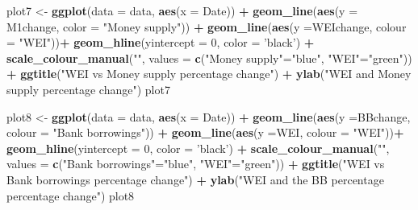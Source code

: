\documentclass[]{article}
\newenvironment{Shaded}{\begin{snugshade}}{\end{snugshade}}
\newcommand{\KeywordTok}[1]{\textcolor[rgb]{0.13,0.29,0.53}{\textbf{#1}}}
\newcommand{\DataTypeTok}[1]{\textcolor[rgb]{0.13,0.29,0.53}{#1}}
\newcommand{\DecValTok}[1]{\textcolor[rgb]{0.00,0.00,0.81}{#1}}
\newcommand{\StringTok}[1]{\textcolor[rgb]{0.31,0.60,0.02}{#1}}
\newcommand{\OperatorTok}[1]{\textcolor[rgb]{0.81,0.36,0.00}{\textbf{#1}}}
\newcommand{\NormalTok}[1]{#1}
\begin{document}
\begin{Shaded}
\begin{Highlighting}[]
\NormalTok{plot7 <-}\StringTok{ }\KeywordTok{ggplot}\NormalTok{(}\DataTypeTok{data =}\NormalTok{ data, }\KeywordTok{aes}\NormalTok{(}\DataTypeTok{x =}\NormalTok{ Date)) }\OperatorTok{+}\StringTok{ }
\StringTok{  }\KeywordTok{geom_line}\NormalTok{(}\KeywordTok{aes}\NormalTok{(}\DataTypeTok{y =}\NormalTok{ M1change, }\DataTypeTok{color =} \StringTok{"Money supply"}\NormalTok{)) }\OperatorTok{+}
\StringTok{  }\KeywordTok{geom_line}\NormalTok{(}\KeywordTok{aes}\NormalTok{(}\DataTypeTok{y =}\NormalTok{WEIchange, }\DataTypeTok{colour =} \StringTok{"WEI"}\NormalTok{))}\OperatorTok{+}
\StringTok{  }\KeywordTok{geom_hline}\NormalTok{(}\DataTypeTok{yintercept =} \DecValTok{0}\NormalTok{, }\DataTypeTok{color =} \StringTok{'black'}\NormalTok{) }\OperatorTok{+}\StringTok{ }
\StringTok{  }\KeywordTok{scale_colour_manual}\NormalTok{(}\StringTok{""}\NormalTok{,  }\DataTypeTok{values =} \KeywordTok{c}\NormalTok{(}\StringTok{"Money supply"}\NormalTok{=}\StringTok{"blue"}\NormalTok{, }\StringTok{"WEI"}\NormalTok{=}\StringTok{"green"}\NormalTok{)) }\OperatorTok{+}
\StringTok{  }\KeywordTok{ggtitle}\NormalTok{(}\StringTok{"WEI vs Money supply percentage change"}\NormalTok{) }\OperatorTok{+}
\StringTok{  }\KeywordTok{ylab}\NormalTok{(}\StringTok{"WEI and Money supply percentage change"}\NormalTok{) }
\NormalTok{plot7}

\NormalTok{plot8 <-}\StringTok{ }\KeywordTok{ggplot}\NormalTok{(}\DataTypeTok{data =}\NormalTok{ data, }\KeywordTok{aes}\NormalTok{(}\DataTypeTok{x =}\NormalTok{ Date)) }\OperatorTok{+}
\StringTok{  }\KeywordTok{geom_line}\NormalTok{(}\KeywordTok{aes}\NormalTok{(}\DataTypeTok{y =}\NormalTok{BBchange, }\DataTypeTok{colour =} \StringTok{"Bank borrowings"}\NormalTok{)) }\OperatorTok{+}
\StringTok{  }\KeywordTok{geom_line}\NormalTok{(}\KeywordTok{aes}\NormalTok{(}\DataTypeTok{y =}\NormalTok{WEI, }\DataTypeTok{colour =} \StringTok{"WEI"}\NormalTok{))}\OperatorTok{+}\StringTok{ }
\StringTok{  }\KeywordTok{geom_hline}\NormalTok{(}\DataTypeTok{yintercept =} \DecValTok{0}\NormalTok{, }\DataTypeTok{color =} \StringTok{'black'}\NormalTok{) }\OperatorTok{+}\StringTok{ }
\StringTok{  }\KeywordTok{scale_colour_manual}\NormalTok{(}\StringTok{""}\NormalTok{, }\DataTypeTok{values =} \KeywordTok{c}\NormalTok{(}\StringTok{"Bank borrowings"}\NormalTok{=}\StringTok{"blue"}\NormalTok{, }\StringTok{"WEI"}\NormalTok{=}\StringTok{"green"}\NormalTok{)) }\OperatorTok{+}
\StringTok{  }\KeywordTok{ggtitle}\NormalTok{(}\StringTok{"WEI vs Bank borrowings percentage change"}\NormalTok{) }\OperatorTok{+}
\StringTok{  }\KeywordTok{ylab}\NormalTok{(}\StringTok{"WEI and the BB percentage percentage change"}\NormalTok{)  }
\NormalTok{plot8}


\end{Highlighting}
\end{Shaded}
\end{document}

